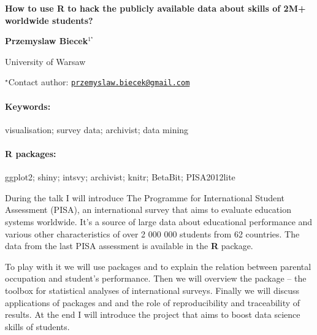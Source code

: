 \documentclass[11pt, a4paper]{article}
\renewcommand{\title}[1]{\begin{center}{\bf \LARGE #1}\end{center}}
\newcommand{\keywords}{\paragraph{Keywords:}}
\newcommand{\packages}{\paragraph{R packages:}}
\begin{document}
\pagestyle{empty}

\title{How to use R to hack the publicly available data about skills of 2M+
worldwide students?}

\begin{center}
  {\bf Przemyslaw Biecek$^{1^\star}$}
\end{center}

\vskip 0.3cm

\begin{affiliations}
\begin{enumerate}
\begin{minipage}{0.915\textwidth}
\centering
\item University of Warsaw \\[-2pt]
\end{minipage}
\end{enumerate}
$^\star$Contact author: \href{mailto:przemyslaw.biecek@gmail.com}{\nolinkurl{przemyslaw.biecek@gmail.com}}\\
\end{affiliations}

\vskip 0.5cm

\begin{minipage}{0.915\textwidth}
\keywords visualisation; survey data; archivist; data mining
\packages ggplot2; shiny; intsvy; archivist; knitr; BetaBit; PISA2012lite
\end{minipage}

\vskip 0.8cm

During the talk I will introduce The Programme for International Student
Assessment (PISA), an international survey that aims to evaluate
education systems worldwide. It's a source of large data about
educational performance and various other characteristics of over 2 000
000 students from 62 countries. The data from the last PISA assessment
is available in the \textbf{R} package.

To play with it we will use packages and to explain the relation between
parental occupation and student's performance. Then we will overview the
package -- the toolbox for statistical analyses of international
surveys. Finally we will discuss applications of packages and and the
role of reproducibility and traceability of results. At the end I will
introduce the project that aims to boost data science skills of
students.
\end{document}
